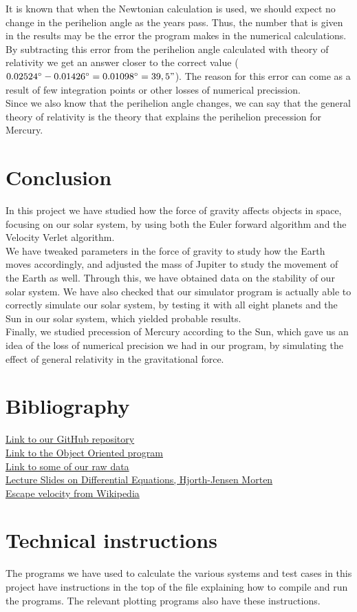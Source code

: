 \documentclass{article}
\begin{document}
    It is known that when the Newtonian calculation is used, we should expect no change in the perihelion angle as the years pass. Thus, the number that is given in the results may be the error the program makes in the numerical calculations. By subtracting this error from the perihelion angle calculated with theory of relativity we get an answer closer to the correct value ($0.02524^\circ - 0.01426^\circ = 0.01098^\circ = 39,5" $). The reason for this error can come as a result of few integration points or other losses of numerical precission. \\
    Since we also know that the perihelion angle changes, we can say that the general theory of relativity is the theory that explains the perihelion precession for Mercury.

\section{Conclusion}
    In this project we have studied how the force of gravity affects objects in space, focusing on our solar system, by using both the Euler forward algorithm and the Velocity Verlet algorithm.\\ We have tweaked parameters in the force of gravity to study how the Earth moves accordingly, and adjusted the mass of Jupiter to study the movement of the Earth as well. Through this, we have obtained data on the stability of our solar system. We have also checked that our simulator program is actually able to correctly simulate our solar system, by testing it with all eight planets and the Sun in our solar system, which yielded probable results.\\
    Finally, we studied precession of Mercury according to the Sun, which gave us an idea of the loss of numerical precision we had in our program, by simulating the effect of general relativity in the gravitational force.

\newpage
\section{Bibliography}
    \href{https://github.com/emmernme/MENA-Compfys/tree/master/Project5/}{Link to our GitHub repository}\\
    \href{https://github.com/emmernme/MENA-Compfys/tree/master/Project5/OO-program/}{Link to the Object Oriented program}\\
    \href{https://github.com/emmernme/MENA-Compfys/tree/master/Project5/raw_data/}{Link to some of our raw data}\\
    \noindent \href{http://compphysics.github.io/ComputationalPhysics/doc/pub/ode/pdf/ode-print.pdf}{Lecture Slides on Differential Equations, Hjorth-Jensen Morten}\\
    \noindent \href{https://en.wikipedia.org/wiki/Escape_velocity}{Escape velocity from Wikipedia}\\

\section{Technical instructions}
    The programs we have used to calculate the various systems and test cases in this project have instructions in the top of the file explaining how to compile and run the programs. The relevant plotting programs also have these instructions.
\end{document}
